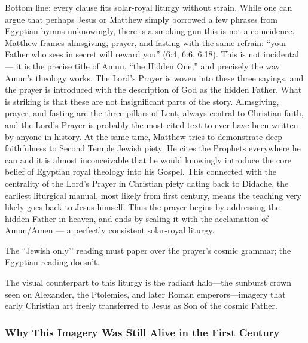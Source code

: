 Bottom line: every clause fits solar-royal liturgy without strain.
While one can argue that perhaps Jesus or Matthew simply borrowed a few phrases from Egyptian hymns unknowingly, there is a smoking gun this is not a coincidence.
Matthew frames almsgiving, prayer, and fasting with the same refrain: ``your Father who sees in secret will reward you'' (6:4, 6:6, 6:18).
This is not incidental --- it is the precise title of Amun, ``the Hidden One,'' and precisely the way Amun's theology works.
The Lord's Prayer is woven into these three sayings, and the prayer is introduced with the description of God as the hidden Father.
What is striking is that these are not insignificant parts of the story.
Almsgiving, prayer, and fasting are the three pillars of Lent, always central to Christian faith, and the Lord's Prayer is probably the most cited text to ever have been written by anyone in history.
At the same time, Matthew tries to demonstrate deep faithfulness to Second Temple Jewish piety.
He cites the Prophets everywhere he can and it is almost inconceivable that he would knowingly introduce the core belief of Egyptian royal theology into his Gospel.
This connected with the centrality of the Lord's Prayer in Christian piety dating back to Didache, the earliest liturgical manual, most likely from first century, means the teaching very likely goes back to Jesus himself.
Thus the prayer begins by addressing the hidden Father in heaven, and ends by sealing it with the acclamation of Amun/Amen --- a perfectly consistent solar-royal liturgy.

The ``Jewish only’’ reading must paper over the prayer’s cosmic grammar; the Egyptian reading doesn’t.

The visual counterpart to this liturgy is the radiant halo---the sunburst crown seen on Alexander, the Ptolemies, and later Roman emperors---imagery that early Christian art freely transferred to Jesus as Son of the cosmic Father.

\subsubsection{Why This Imagery Was Still Alive in the First Century}

